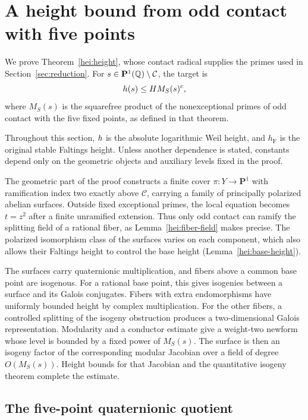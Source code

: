 \section{A height bound from odd contact with five points}\label{hei:section}

We prove Theorem~\ref{hei:height}, whose contact radical supplies the
primes used in Section~\ref{sec:reduction}.  For
\(s\in\mathbf P^1(\mathbb Q)\setminus\mathcal C\), the target is
\[
                         h(s)\le H M_S(s)^c,
\]
where \(M_S(s)\) is the squarefree product of the nonexceptional primes
of odd contact with the five fixed points, as defined in that theorem.

Throughout this section, $h$ is the absolute logarithmic Weil height,
and $h_{\mathrm F}$ is the original stable Faltings height.  Unless
another dependence is stated, constants depend only on the geometric
objects and auxiliary levels fixed in the proof.

The geometric part of the proof constructs a finite cover
$\pi:Y\to\mathbf P^1$ with ramification index two exactly above
$\mathcal C$, carrying a family of principally polarized abelian surfaces.
Outside fixed exceptional primes, the local equation becomes $t=z^2$
after a finite unramified extension.  Thus only odd contact can ramify
the splitting field of a rational fiber, as Lemma~\ref{hei:fiber-field}
makes precise.
The polarized isomorphism class of the surfaces varies on each component,
which also allows their Faltings height to control the base height
(Lemma~\ref{hei:base-height}).

The surfaces carry quaternionic multiplication, and fibers above a common
base point are isogenous.  For a rational base point, this gives isogenies
between a surface and its Galois conjugates.  Fibers with extra
endomorphisms have uniformly bounded height by complex multiplication.
For the other fibers, a controlled splitting of the isogeny obstruction
produces a two-dimensional Galois representation.  Modularity and a
conductor estimate give a weight-two newform whose level is bounded by a
fixed power of $M_S(s)$.  The surface is then an isogeny factor of the
corresponding modular Jacobian over a field of degree $O(M_S(s))$.
Height bounds for that Jacobian and the quantitative isogeny theorem
complete the estimate.


\subsection{The five-point quaternionic quotient}

